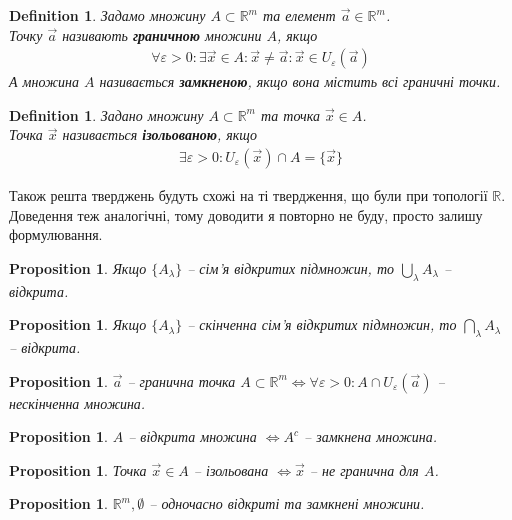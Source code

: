 \documentclass[a4paper, 10pt]{article}
\def\huge{\displaystyle}
\theoremstyle{theoremdd}
\theoremstyle{theoremdd}
\theoremstyle{theoremdd}
\newtheorem{definition}[theorem]{Definition}
\theoremstyle{theoremdd}
\theoremstyle{theoremdd}
\theoremstyle{theoremdd}
\newtheorem{proposition}[theorem]{Proposition}
\theoremstyle{theoremdd}
\theoremstyle{theoremdd}
\theoremstyle{theoremdd}
\begin{document}
\begin{definition}
Задамо множину $A \subset \mathbb{R}^m$ та елемент $\vec{a} \in \mathbb{R}^m$.\\
Точку $\vec{a}$ називають \textbf{граничною} множини $A$, якщо
\begin{align*}
\forall \varepsilon > 0: \exists \vec{x} \in A: \vec{x} \neq \vec{a}: \vec{x} \in U_{\varepsilon}(\vec{a})
\end{align*}
А множина $A$ називається \textbf{замкненою}, якщо вона містить всі граничні точки.
\end{definition}

\begin{definition}
Задано множину $A \subset \mathbb{R}^m$ та точка $\vec{x} \in A$.\\
Точка $\vec{x}$ називається \textbf{ізольованою}, якщо
\begin{align*}
\exists \varepsilon > 0: U_\varepsilon(\vec{x}) \cap A = \{\vec{x}\}
\end{align*}
\end{definition}

Також решта тверджень будуть схожі на ті твердження, що були при топології $\mathbb{R}$. Доведення теж аналогічні, тому доводити я повторно не буду, просто залишу формулювання.
\begin{proposition}
Якщо $\{A_\lambda\}$ -- сім'я відкритих підмножин, то $\huge\bigcup_\lambda A_\lambda$ -- відкрита.
\end{proposition}

\begin{proposition}
Якщо $\{A_\lambda\}$ -- скінченна сім'я відкритих підмножин, то $\huge\bigcap_\lambda A_\lambda$ -- відкрита.
\end{proposition}

\begin{proposition}
$\vec{a}$ -- гранична точка $A \subset \mathbb{R}^m \iff \forall \varepsilon > 0: A \cap U_\varepsilon (\vec{a})$ -- нескінченна множина.
\end{proposition}

\begin{proposition}
$A$ -- відкрита множина $\iff A^c$ -- замкнена множина.
\end{proposition}

\begin{proposition}
Точка $\vec{x} \in A$ -- ізольована $\iff \vec{x}$ -- не гранична для $A$.
\end{proposition}

\begin{proposition}
$\mathbb{R}^m, \emptyset$ -- одночасно відкриті та замкнені множини.
\end{proposition}
\end{document}
